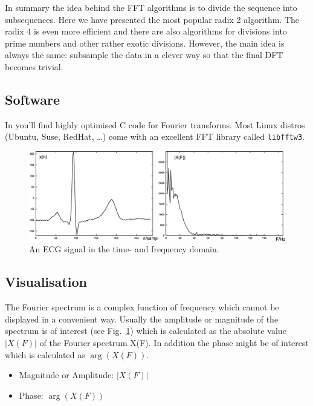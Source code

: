 \documentclass[12pt,a4paper]{article}
\begin{document}
In summary the idea behind the FFT algorithms is to divide the sequence
into subsequences. Here we have presented the most popular radix 2 algorithm.
The radix 4 is even more efficient and there are also algorithms
for divisions into prime numbers and other rather exotic divisions.
However, the main idea is always the same: subsample the data in a clever
way so that the final DFT becomes trivial.

\subsection{Software}
In \citet{NumericalRec2007} you'll find highly optimised C code
for Fourier transforms. Most Linux distros (Ubuntu, Suse, RedHat, \ldots)
come with an excellent FFT library called \texttt{libfftw3}.


\begin{figure}[!hbt]
\begin{center}
\mbox{\includegraphics[width=\textwidth]{visualisation}}
\end{center}
\caption{
An ECG signal in the time- and frequency domain.
\label{visualisation}}
\end{figure}


\subsection{Visualisation}
The Fourier spectrum is a complex function of frequency which cannot
be displayed in a convenient way. Usually the amplitude or magnitude
of the spectrum is of interest (see Fig.~\ref{visualisation}) which is calculated as the
absolute value $|X(F)|$ of the Fourier spectrum X(F). In addition
the phase might be of interest which is calculated as $\arg(X(F))$.
\begin{itemize}
\item Magnitude or Amplitude: $|X(F)|$
\item Phase: $\arg(X(F))$
\end{itemize}

\clearpage
\end{document}
